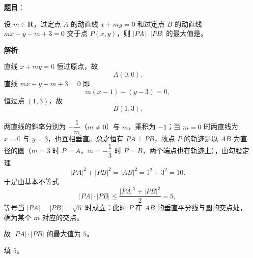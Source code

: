 \begin{answer}

\textbf{题目}：

设 $m\in\mathbf R$，过定点 $A$ 的动直线 $x+my=0$ 和过定点 $B$ 的动直线 $mx-y-m+3=0$ 交于点 $P(x,y)$，则 $|PA|\cdot|PB|$ 的最大值是\gkblank{}。

\textbf{解析}

直线 $x+my=0$ 恒过原点，故
\nopagebreak[4]
\[A(0,0).\]
直线 $mx-y-m+3=0$ 即
\nopagebreak[4]
\[m(x-1)-(y-3)=0,\]
恒过点 $(1,3)$，故
\nopagebreak[4]
\[B(1,3).\]

两直线的斜率分别为 $-\dfrac1m$（$m\neq 0$）与 $m$，乘积为 $-1$；当 $m=0$ 时两直线为 $x=0$ 与 $y=3$，也互相垂直。总之恒有 $PA\perp PB$，故点 $P$ 的轨迹是以 $AB$ 为直径的圆（$m=3$ 时 $P=A$，$m=-\dfrac13$ 时 $P=B$，两个端点也在轨迹上），由勾股定理
\nopagebreak[4]
\[|PA|^2+|PB|^2=|AB|^2=1^2+3^2=10 .\]
于是由基本不等式
\nopagebreak[4]
\[|PA|\cdot|PB|\leqslant\frac{|PA|^2+|PB|^2}{2}=5,\]
等号当 $|PA|=|PB|=\sqrt5$ 时成立：此时 $P$ 在 $AB$ 的垂直平分线与圆的交点处，确为某个 $m$ 对应的交点。

故 $|PA|\cdot|PB|$ 的最大值为 $5$。

填 $5$。


\end{answer}
